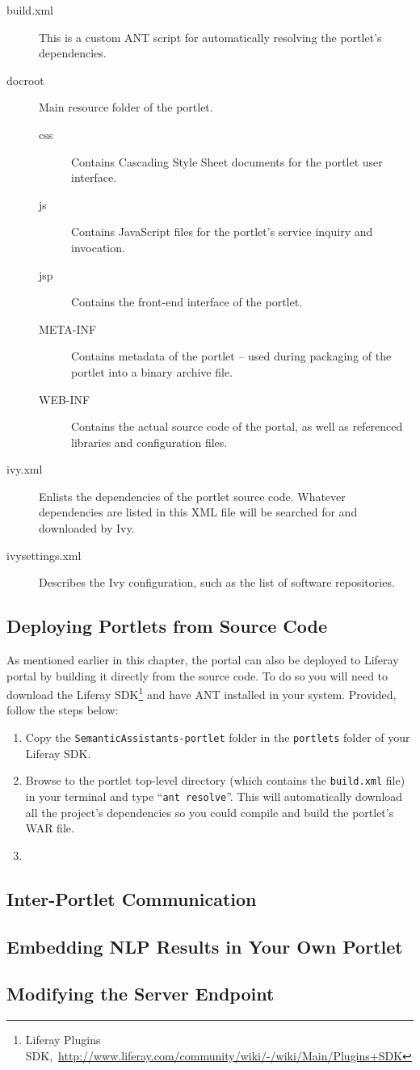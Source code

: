 \begin{description}
\item [build.xml] This is a custom ANT script for automatically resolving the portlet's dependencies.
\item [docroot] Main resource folder of the portlet.
\begin{description}
\item[css] Contains Cascading Style Sheet documents for the portlet user interface.
\item[js] Contains JavaScript files for the portlet's service inquiry and invocation.
\item[jsp] Contains the front-end interface of the portlet.
\item[META-INF] Contains metadata of the portlet -- used during packaging of the portlet into a binary archive file.
\item[WEB-INF] Contains the actual source code of the portal, as well as referenced libraries and configuration files.
\end{description}

\item [ivy.xml] Enlists the dependencies of the portlet source code. Whatever dependencies are listed in this XML file will be searched for and downloaded by Ivy.
\item [ivysettings.xml] Describes the Ivy configuration, such as the list of software repositories.
\end{description}

\subsection{Deploying Portlets from Source Code}
\label{sec:src_deploy}
As mentioned earlier in this chapter, the \sa portal can also be deployed to Liferay portal by building it directly from the source code. To do so you will need to download the Liferay SDK\footnote{Liferay Plugins SDK,~\url{http://www.liferay.com/community/wiki/-/wiki/Main/Plugins+SDK}} and have ANT installed in your system. Provided, follow the steps below:

\begin{enumerate}
\item Copy the \texttt{SemanticAssistants-portlet} folder in the \texttt{portlets} folder of your Liferay SDK.
\item Browse to the \sa portlet top-level directory (which contains the \texttt{build.xml} file) in your terminal and type ``\texttt{ant resolve}''. This will automatically download all the project's dependencies so you could compile and build the portlet's WAR file.
\item 
\end{enumerate}

\subsection{Inter-Portlet Communication}
\subsection{Embedding NLP Results in Your Own Portlet}
\subsection{Modifying the \sa Server Endpoint}
\label{sec:server_change}